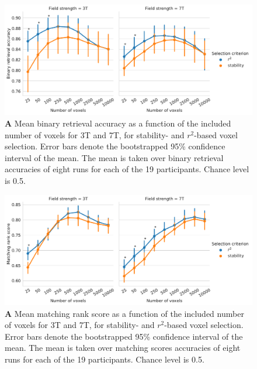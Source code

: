 \begin{figure}[H]
  \centering
  \includegraphics[width=\linewidth]{pics/binary_selection.pdf}
	
  \caption{\textbf{A} Mean binary retrieval accuracy as a function of the
  included number of voxels for 3T and 7T, for stability- and $r^2$-based
  voxel selection. Error bars denote the bootstrapped 95\% confidence interval
  of the mean. The mean is taken over binary retrieval accuracies of eight runs
  for each of the 19 participants. Chance level is 0.5.
}

 \label{fig:binary_retrieval_selection}\end{figure}

\begin{figure}[H]
  \centering
    \includegraphics[width=\linewidth]{pics/rank_selection.pdf}
	
  \caption{\textbf{A} Mean matching rank score as a function of the included number
  of voxels for 3T and 7T, for stability- and $r^2$-based voxel selection.
  Error bars denote the bootstrapped 95\% confidence interval of the mean. The
  mean is taken over matching scores accuracies of eight runs for each of the
  19 participants. Chance level is 0.5.}

 \label{fig:matching_score_selection}
\end{figure}


